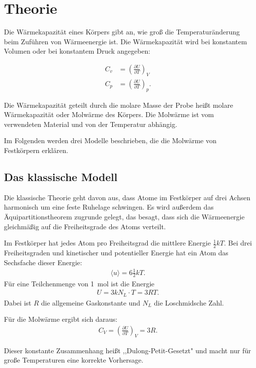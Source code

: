 \section{Theorie}

Die Wärmekapazität eines Körpers gibt an, wie groß die Temperaturänderung beim Zuführen von Wärmeenergie ist.
Die Wärmekapazität wird bei konstantem Volumen oder bei konstantem Druck angegeben:

\begin{align}
	C_v &= \left( \frac{\partial U}{\partial T} \right)_V \\
	C_p &= \left( \frac{\partial U}{\partial T} \right)_p.
\end{align}

Die Wärmekapazität geteilt durch die molare Masse der Probe heißt molare Wärmekapazität oder Molwärme des Körpers.
Die Molwärme ist vom verwendeten Material und von der Temperatur abhängig.

Im Folgenden werden drei Modelle beschrieben, die die Molwärme von Festkörpern erklären.

\subsection{Das klassische Modell}
Die klassische Theorie geht davon aus, dass Atome im Festkörper auf drei Achsen harmonisch um eine feste Ruhelage schwingen.
Es wird außerdem das Äquipartitionstheorem zugrunde gelegt, das besagt, dass sich die Wärmeenergie gleichmäßig auf die Freiheitsgrade des Atoms verteilt.

Im Festkörper hat jedes Atom pro Freiheitsgrad die mittlere Energie $\frac{1}{2}kT$.
Bei drei Freiheitsgraden und kinetischer und potentieller Energie hat ein Atom das Sechsfache dieser Energie:
\begin{align}
	\langle u \rangle = 6\frac{1}{2}kT.
\end{align}
Für eine Teilchenmenge von \SI{1}{\mol} ist die Energie
\begin{align}
	U = 3kN_L \cdot T = 3RT.
\end{align}
Dabei ist $R$ die allgemeine Gaskonstante und $N_L$ die Loschmidsche Zahl.

Für die Molwärme ergibt sich daraus:
\begin{align}
	C_V = \left(\frac{\partial U}{\partial T}\right)_V = 3R.
\end{align}

Dieser konstante Zusammenhang heißt ,,Dulong-Petit-Gesetzt" und macht nur für große Temperaturen eine korrekte Vorhersage.

